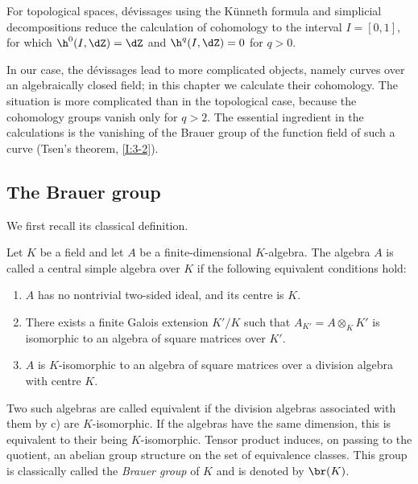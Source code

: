 For topological spaces, dévissages using the K\"unneth formula and
simplicial decompositions reduce the calculation of cohomology to the
interval $I=[0,1]$, for which $\h^0(I,\dZ)=\dZ$ and
$\h^q(I,\dZ)=0$ for $q>0$.

In our case, the dévissages lead to more complicated objects, namely curves
over an algebraically closed field; in this chapter we calculate their
cohomology. The situation is more complicated than in the topological case,
because the cohomology groups vanish only for $q>2$. The essential
ingredient in the calculations is the vanishing of the Brauer group of the
function field of such a curve (Tsen's theorem, \ref{I:3-2}).

\subsection{The Brauer group}\label{I:3-1}

We first recall its classical definition.

\begin{definition}\label{I:3-1-1}
Let $K$ be a field and let $A$ be a finite-dimensional $K$-algebra. The
algebra $A$ is called a central simple algebra over $K$ if the following
equivalent conditions hold:
\begin{enumerate}[\indent a)]
  \item $A$ has no nontrivial two-sided ideal, and its centre is $K$.
  \item There exists a finite Galois extension $K'/K$ such that
    $A_{K'}=A\otimes_KK'$ is isomorphic to an algebra of square matrices
    over $K'$.
  \item $A$ is $K$-isomorphic to an algebra of square matrices over a
    division algebra with centre $K$.
\end{enumerate}
\end{definition}

Two such algebras are called equivalent if the division algebras associated
with them by c) are $K$-isomorphic. If the algebras have the same
dimension, this is equivalent to their being $K$-isomorphic. Tensor product
induces, on passing to the quotient, an abelian group structure on the set
of equivalence classes. This group is classically called the
\emph{Brauer group} of $K$ and is denoted by $\br(K)$.

\subsubsection{}\label{I:3-1-2}

